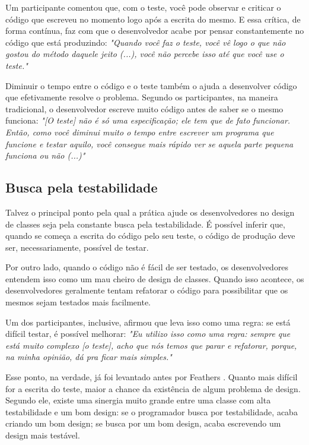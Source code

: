 Um participante comentou que, com o teste, você pode observar
e criticar o código que escreveu no momento logo após a escrita do mesmo.
E essa crítica, de forma contínua, faz com que o desenvolvedor acabe
por pensar constantemente no código que está produzindo:
\textit{"Quando você faz o teste, você vê logo o que não gostou do método daquele jeito (...), você
não percebe isso até que você use o teste."}

Diminuir o tempo entre o código e o teste também o ajuda a desenvolver código
que efetivamente resolve o problema. Segundo os participantes, na maneira tradicional, 
o desenvolvedor escreve muito código antes de saber se o mesmo funciona:
\textit{"[O teste] não é só uma especificação; ele tem que de fato funcionar. Então,
como você diminui muito o tempo entre escrever um programa que funcione e testar aquilo,
você consegue mais rápido ver se aquela parte pequena funciona ou não (...)"}


\subsection{Busca pela testabilidade}

Talvez o principal ponto pela qual a prática ajude os desenvolvedores no design de classes 
seja pela constante busca pela testabilidade. É possível inferir que, quando se 
começa a escrita do código pelo seu teste, o código de produção deve ser, necessariamente,
possível de testar.

Por outro lado, quando o código não é fácil de ser testado, os desenvolvedores
entendem isso como um mau cheiro de design de classes. Quando isso acontece,
os desenvolvedores geralmente tentam refatorar o código para possibilitar que
os mesmos sejam testados mais facilmente.

Um dos participantes, inclusive, afirmou que leva isso como uma regra:
se está difícil testar, é possível melhorar:
\textit{"Eu utilizo isso como uma regra: sempre que está muito complexo [o teste],
acho que nós temos que parar e refatorar, porque, na minha opinião, dá
pra ficar mais simples."}

Esse ponto, na verdade, já foi levantado antes por Feathers \cite{feathers-synergy}.
Quanto mais difícil for a escrita do teste, maior a chance da existência de
algum problema de design. Segundo ele, 
existe uma sinergia muito grande entre uma classe com alta testabilidade e um bom design: 
se o programador busca por testabilidade, acaba criando um bom design; se 
busca por um bom design, acaba escrevendo um design mais
testável.

